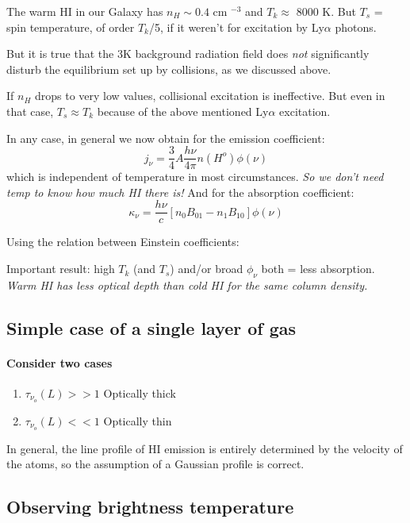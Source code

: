\documentclass[12pt]{article}
\newcommand{\mar}[1]{\hspace{0pt}\marginpar{-\textcolor{black}{#1}-}}
\newcommand{\mynotes}[1]{{\fontfamily{cmss}\selectfont \textit{#1}}}
\begin{document}
The warm HI in our Galaxy has $n_{H}\sim0.4$ cm $^{-3}$ and $T_{k} \approx$ 8000 K.
But $T_{s}$ = spin temperature, of order $T_{k}$/5, if it weren't for
excitation by Ly$\alpha$ photons.

But it is true that the 3K background radiation field does \emph{not}
significantly disturb the equilibrium set up by collisions, as we
discussed above.

If $n_{H}$ drops to very low values, collisional excitation is ineffective.
But even in that case, $T_{s} \approx T_{k}$ because of the above mentioned
Ly$\alpha$ excitation.

In any case, in general we now obtain for the emission coefficient:
\[
    j_{\nu} = \frac{3}{4} A \frac{h\nu}{4\pi} n(H^{o}) \phi(\nu)
    \]
which is independent of temperature in most circumstances.
\mynotes{So we don't need temp to know how much HI there is!}
And for the absorption coefficient:
\[
    \kappa_{\nu} = \frac{h\nu}{c} \left[
        n_{0}B_{01} - n_{1}B_{10} \right]
        \phi(\nu)
    \]

\mar{38}
Using the relation between Einstein coefficients:

\textcolor{bred}{Important result:} high $T_{k}$ (and $T_{s}$) and/or
broad $\phi_{\nu}$ both = less absorption. \mynotes{Warm HI has less optical
depth than cold HI for the same column density.}

\subsection{Simple case of a single layer of gas}

\mar{39}
\paragraph{Consider two cases}
\begin{enumerate}[label={(\roman*)}]
    \item $\tau_{\nu_{o}}(L) >> 1$ Optically thick
    \item $\tau_{\nu_{o}}(L) << 1$ Optically thin
\end{enumerate}
In general, the line profile of HI emission is entirely determined by the velocity
of the atoms, so the assumption of a Gaussian profile is correct.

\mar{40}
\subsection{Observing brightness temperature}
\end{document}
